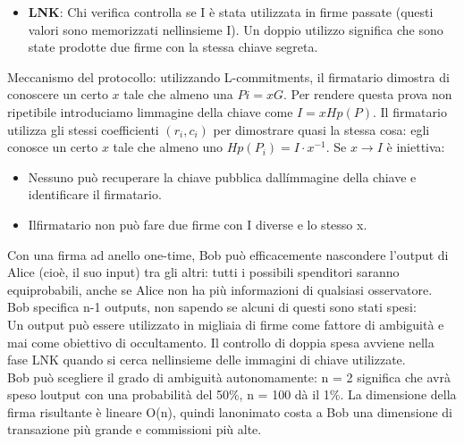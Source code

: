\begin{itemize}
\[ \begin{cases}
L_i' = r_iG + c_iP_i \\
R_i' = r_iH_p(P_i) + c_iI
\end{cases}
 \] Chi verifica controlla se
\[\sum_{i=1}^{n} ci =^? H_s(m,L_1',...,L_n',R_1',...R_n') \mod l \]

Se questa uguaglianza è vera, chi verifica esegue
l\textquotesingle algoritmo \textbf{LNK}, altrimenti respinge la firma.
\item 
  \textbf{LNK}: Chi verifica controlla se I è stata utilizzata in firme
passate (questi valori sono memorizzati nell\textquotesingle insieme I).
Un doppio utilizzo significa che sono state prodotte due firme con la
stessa chiave segreta.\\
\end{itemize}
Meccanismo del protocollo: utilizzando L-commitments, il firmatario
dimostra di conoscere un certo $x$ tale che almeno una $Pi = xG$.
Per rendere
questa prova non ripetibile introduciamo l\textquotesingle immagine
della chiave come $I=xHp(P)$. Il firmatario utilizza gli stessi
coefficienti $(r_i,c_i)$ per dimostrare quasi la stessa cosa: egli conosce
un certo $x$ tale che almeno uno $Hp(P_i)=I \cdot x^{-1}$. Se $x \rightarrow I$ è iniettiva:

\begin{itemize}
\item 
  Nessuno può recuperare la chiave pubblica dall\'immagine della chiave e identificare il firmatario.
\item 
  Ilfirmatario non può fare due firme con I diverse e lo stesso x.
\end{itemize}

Con una firma ad anello one-time, Bob può efficacemente nascondere
l'output di Alice (cioè, il suo input) tra gli altri: tutti i possibili
spenditori saranno equiprobabili, anche se Alice non ha più informazioni
di qualsiasi osservatore. Bob specifica n-1 outputs, non sapendo se
alcuni di questi sono stati spesi:\\
Un output può essere utilizzato in migliaia di firme come fattore di
ambiguità e mai come obiettivo di occultamento. Il controllo di doppia
spesa avviene nella fase LNK quando si cerca
nell\textquotesingle insieme delle immagini di chiave utilizzate.\\
Bob può scegliere il grado di ambiguità autonomamente: n = 2 significa
che avrà speso l\textquotesingle output con una probabilità del 50\%, n
= 100 dà il 1\%. La dimensione della firma risultante è lineare O(n),
quindi l\textquotesingle anonimato costa a Bob una dimensione di
transazione più grande e commissioni più alte.

